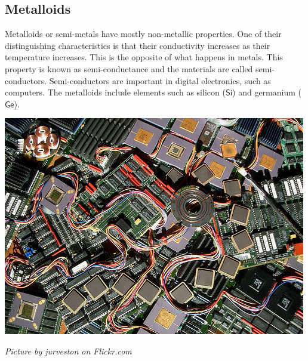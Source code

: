             \subsection*{Metalloids}
            \nopagebreak
\begin{minipage}{.5\textwidth}
        \label{m38708*id66042}Metalloids or semi-metals have mostly non-metallic properties. One of their distinguishing characteristics is that their conductivity increases as their temperature increases. This is the opposite of what happens in metals. This property is known as semi-conductance and the materials are called semi-conductors. Semi-conductors are important in digital electronics, such as computers. The metalloids include elements such as silicon ($\mathsf{Si}$) and germanium ($\mathsf{Ge}$).\par 
\end{minipage}
\begin{minipage}{.5\textwidth}
\begin{center}
 \includegraphics[width=.6\textwidth]{photos/siliconby-jurveston.jpg}\par
\textit{Picture by jurveston on Flickr.com}
\end{center}
\end{minipage}
\par \label{m38708*eip-586}\vspace{.5cm} 
      \noindent

